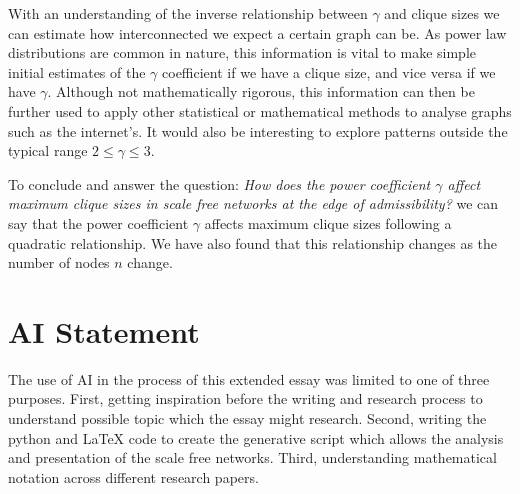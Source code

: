 \documentclass[12pt, a4paper]{article}   %
\begin{document}
With an understanding of the inverse relationship between \( \gamma \) and clique sizes we can estimate how interconnected we expect a certain graph can be. As power law distributions are common in nature, this information is vital to make simple initial estimates of the \( \gamma \) coefficient if we have a clique size, and vice versa if we have \( \gamma \). Although not mathematically rigorous, this information can then be further used to apply other statistical or mathematical methods to analyse graphs such as the internet's. It would also be interesting to explore patterns outside the typical range \(2 \leq \gamma \leq 3\).

To conclude and answer the question: \textit{How does the power coefficient \( \gamma \) affect maximum clique sizes in scale free networks at the edge of admissibility?} we can say that the power coefficient \( \gamma \) affects maximum clique sizes following a quadratic relationship. We have also found that this relationship changes as the number of nodes \(n\) change.


\printbibliography[title={Works Cited}]




\appendix

\section{AI Statement}
The use of AI in the process of this extended essay was limited to one of three purposes. First, getting inspiration before the writing and research process to understand possible topic which the essay might research. Second, writing the python and LaTeX code to create the generative script which allows the analysis and presentation of the scale free networks. Third, understanding mathematical notation across different research papers.
\end{document}
